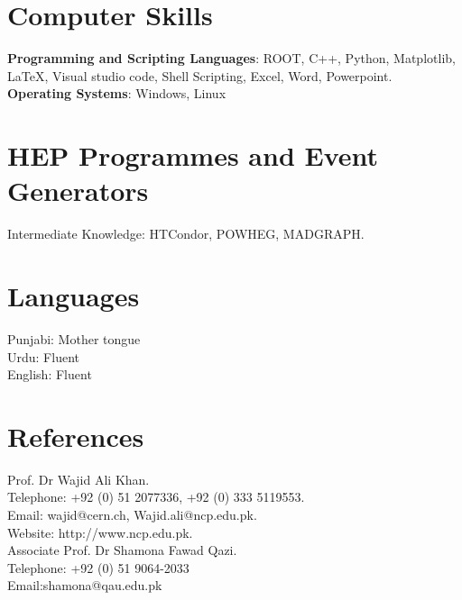 \documentclass[margin,line]{res}
\begin{document}
\begin{resume}
\section{\sc Computer Skills}
{\bf Programming and Scripting Languages}: ROOT, C++, Python, Matplotlib, LaTeX, Visual studio code, Shell Scripting, Excel, Word, Powerpoint.\\
{\bf Operating Systems}: Windows, Linux\\

\section{\sc HEP Programmes and Event Generators}
 Intermediate Knowledge: HTCondor, POWHEG, MADGRAPH.\\[1cm]
 

\section{\sc Languages}
Punjabi: Mother tongue\\
Urdu: Fluent\\
English: Fluent\\

\section{\sc References }
Prof. Dr Wajid Ali Khan.\\
Telephone: +92 (0) 51 2077336, +92 (0) 333 5119553.\\
Email: wajid@cern.ch, Wajid.ali@ncp.edu.pk.\\
Website: http://www.ncp.edu.pk.\\
Associate Prof. Dr Shamona Fawad Qazi.\\
Telephone: +92 (0) 51 9064-2033\\
Email:shamona@qau.edu.pk\\


\end{resume}
\end{document}
